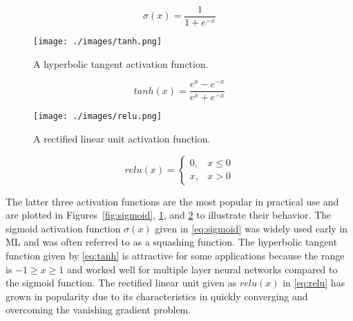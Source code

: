 \begin{equation}\label{eq:sigmoid}
    \sigma(x) = \frac{1}{1 + e^{-x}}
\end{equation}


\begin{figure}[H]
    \centering
    \texttt{[image: ./images/tanh.png]}
    \caption{A hyperbolic tangent activation function.}
    \label{fig:tanh}
\end{figure}

\begin{equation}\label{eq:tanh}
    tanh(x) = \frac{e^x - e^{-x}}{e^x+e^{-x}}
\end{equation}

\begin{figure}[H]
    \centering
    \texttt{[image: ./images/relu.png]}
    \caption{A rectified linear unit activation function.}
    \label{fig:relu}
\end{figure}

\begin{equation}\label{eq:relu}
    relu(x) =
    \begin{cases}
        0,& x \leq 0 \\
        x,& x > 0
    \end{cases}
\end{equation}

The latter three activation functions are the most popular in practical use and
are plotted in Figures~\ref{fig:sigmoid}, \ref{fig:tanh}, and \ref{fig:relu} to
illustrate their behavior. The sigmoid activation function $\sigma(x)$ given in
\eqref{eq:sigmoid} was widely used early in ML and was often referred to as a
squashing function.  The hyperbolic tangent function given by \eqref{eq:tanh} is
attractive for some applications because the range is $-1 \geq x \geq 1$ and
worked well for multiple layer neural networks compared to the sigmoid function.
The rectified linear unit given as $relu(x)$ in \eqref{eq:relu} has grown in
popularity due to its characteristics in quickly converging and overcoming the
vanishing gradient problem\cite{krizhevsky2012imagenet, nwankpa2018activation}.



